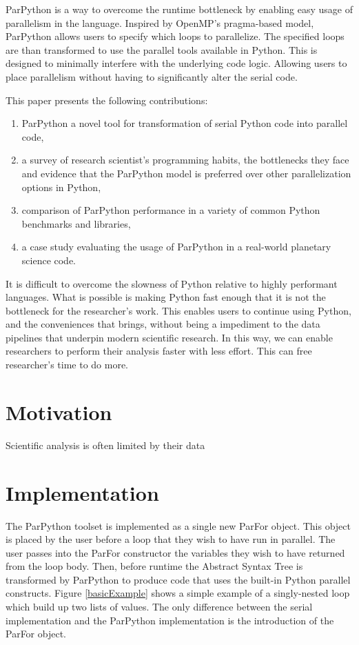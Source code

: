 \documentclass[conference]{IEEEtran}
\begin{document}
ParPython is a way to overcome the runtime bottleneck by enabling
easy usage of parallelism in the language. 
Inspired by OpenMP's pragma-based model\cite{dagum1998openmp}, 
ParPython allows users to specify which loops to parallelize. 
The specified loops are than
transformed to use the parallel tools available in Python. 
This is designed to minimally interfere with the underlying code logic.
Allowing users to place parallelism without having to significantly alter
the serial code.

This paper presents the following contributions: 
\begin{enumerate}
    \item ParPython a novel tool for transformation of serial Python code
    into parallel code,
    \item a survey of research scientist's programming habits, the
    bottlenecks they face and evidence that the ParPython model is 
    preferred over other parallelization options in Python,
    \item comparison of ParPython performance in a variety of 
    common Python benchmarks and libraries,
    \item a case study evaluating the usage of ParPython in
    a real-world planetary science code. 
\end{enumerate}

It is difficult to overcome the slowness of Python relative to
highly performant languages.
What is possible is making Python fast enough that it is not the 
bottleneck for the researcher's work.
This enables users to continue using Python, and the conveniences that 
brings, without being a impediment to the data pipelines that underpin 
modern scientific research.
In this way, we can enable researchers to perform their analysis
faster with less effort. This can free researcher's time to
do more.

\section{Motivation}

Scientific analysis is often limited by their data

\section{Implementation}

The ParPython toolset is implemented as a single new ParFor object. 
This object is placed by the user before a loop that they wish to have run in parallel. 
The user passes into the ParFor constructor the variables they wish to have returned from the loop body.
Then, before runtime the Abstract Syntax Tree is transformed by ParPython to produce code that uses the built-in Python parallel constructs.
Figure \ref{basicExample} shows a simple example of a singly-nested loop which build up two lists of values.
The only difference between the serial implementation and the ParPython implementation is the introduction of the ParFor object.
\end{document}
